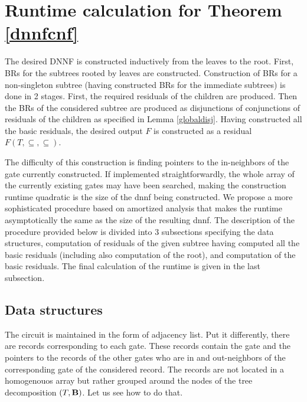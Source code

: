 \documentclass{llncs}
\begin{document}
\section{Runtime calculation for Theorem \ref{dnnfcnf}}
The desired DNNF is constructed inductively from the leaves
to the root. First, BRs for the subtrees rooted by leaves are constructed.
Construction of BRs for a non-singleton subtree (having constructed BRs
for the immediate subtrees) is done in 2 stages. First, the required
residuals of the children are produced. Then the BRs of the considered subtree
are produced as disjunctions of conjunctions of residuals of the children as
specified in Lemma \ref{globaldisj}. Having constructed all the basic residuals,
the desired output $F$ is constructed as a residual $F(T, \subseteq, \subseteq)$. 


The difficulty of this construction is
finding pointers to the in-neighbors of the gate currently constructed. 
If implemented straightforwardly, the whole array of the currently existing
gates may have been searched, making the construction runtime quadratic
is the size of the {\sc dnnf} being constructed. We propose a more sophisticated
procedure based on amortized analysis that makes the runtime asymptotically
the same as the size of the resulting {\sc dnnf}. The description of the procedure
provided below is divided into $3$ subsections specifying the data structures,
computation of residuals of the given subtree having computed all the basic residuals
(including also computation of the root), and computation of the basic residuals. 
The final calculation of the runtime is given in the last subsection.

\subsection{Data structures}
The circuit is maintained in the form of adjacency list. Put it differently, there are records corresponding to each gate.
These records contain the gate and the pointers to the records of the other gates who are in and out-neighbors of
the corresponding gate of the considered record. The records are not located in a homogenouos array but rather grouped
around the nodes of the tree decomposition $(T,{\bf B})$. Let us see how to do that. 
\end{document}
